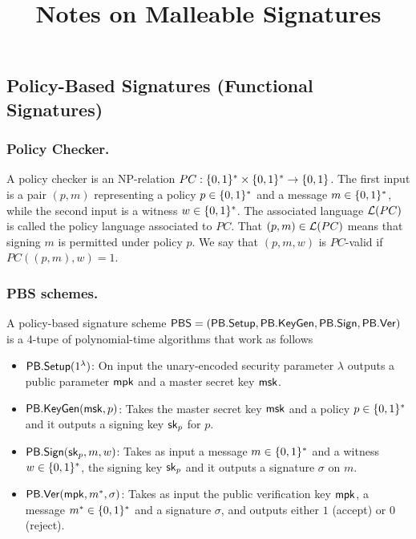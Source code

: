 \documentclass[11pt]{llncs}
\title{Notes on Malleable Signatures}
\author{}
\institute{}
\begin{document}
\maketitle



\subsection{Policy-Based Signatures (Functional Signatures)} %

\subsubsection{Policy Checker.} A policy checker
is an NP-relation $PC: \{0,1\}^* \times \{0,1\}^* \to \{0,1\}$. The first input is a
pair $(p, m)$ representing a policy $p \in  \{0,1\}^*$ and a message
$m \in  \{0,1\}^*$, while the second input is a witness $w \in  \{0,1\}^*$.
 The associated language ${\cal L}(PC)$ is called the policy language associated to
$PC$. That $(p,m) \in  {\cal L}(PC)$ means that signing
$m$ is permitted under policy $p$. We say that
$(p,m,w)$ is $PC$-valid if $PC((p,m),w) = 1$.
\subsubsection{PBS schemes.}
A policy-based signature scheme ${\sf PBS}= ({\sf PB.Setup}, {\sf PB.KeyGen}, {\sf PB.Sign}, {\sf PB.Ver})$ is a 4-tupe of  polynomial-time algorithms that work as follows

\begin{itemize}
\item ${\sf PB.Setup}(1^\lambda)$: On input the unary-encoded security parameter
$\lambda$ outputs a public
parameter ${\sf mpk}$ and a master secret key ${\sf msk}$.

\item ${\sf PB.KeyGen}({\sf msk}, p)$: Takes the master secret key ${\sf msk}$ and a policy $p \in  \{0,1\}^*$ and it outputs a signing key ${\sf sk}_p$ for $p$.

\item ${\sf PB.Sign}({\sf sk}_p, m, w)$: Takes as input a message $m \in \{0,1\}^*$ and a witness $w \in \{0,1\}^*$, the signing key
${\sf sk}_p$ and it outputs a signature $\sigma$  on $m$.

\item ${\sf PB.Ver}({\sf mpk},  m^*, \sigma)$: Takes as input the public verification key ${\sf mpk}$, a message $m^* \in \{0,1\}^*$ and a signature $\sigma$, and outputs either $1$ (accept) or $0$ (reject).
\end{itemize}
\end{document}
